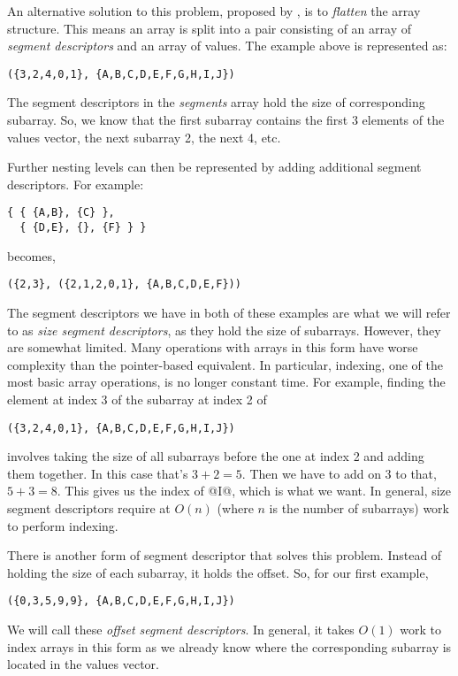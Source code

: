 An alternative solution to this problem, proposed by \citet{Blelloch:compiling1988}, is to \emph{flatten} the array structure. This means an array is split into a pair consisting of an array of \emph{segment descriptors} and an array of values. The example above is represented as:
%
\begin{lstlisting}
({3,2,4,0,1}, {A,B,C,D,E,F,G,H,I,J})
\end{lstlisting}
%
The segment descriptors in the \emph{segments} array hold the size of corresponding subarray. So, we know that the first subarray contains the first 3 elements of the values vector, the next subarray 2, the next 4, etc.

Further nesting levels can then be represented by adding additional segment descriptors. For example:
%
\begin{lstlisting}
{ { {A,B}, {C} },
  { {D,E}, {}, {F} } }
\end{lstlisting}
%
becomes,
%
\begin{lstlisting}
({2,3}, ({2,1,2,0,1}, {A,B,C,D,E,F}))
\end{lstlisting}


The segment descriptors we have in both of these examples are what we will refer to as \emph{size segment descriptors}, as they hold the size of subarrays. However, they are somewhat limited. Many operations with arrays in this form have worse complexity than the pointer-based equivalent. In particular, indexing, one of the most basic array operations, is no longer constant time. For example, finding the element at index 3 of the subarray at index 2 of
%
\begin{lstlisting}
({3,2,4,0,1}, {A,B,C,D,E,F,G,H,I,J})
\end{lstlisting}
%
involves taking the size of all subarrays before the one at index 2 and adding them together. In this case that's $3+2=5$. Then we have to add on 3 to that, $5+3=8$. This gives us the index of @I@, which is what we want. In general, size segment descriptors require at $O(n)$ (where $n$ is the number of subarrays) work to perform indexing.

There is another form of segment descriptor that solves this problem. Instead of holding the size of each subarray, it holds the offset. So, for our first example,
%
\begin{lstlisting}
({0,3,5,9,9}, {A,B,C,D,E,F,G,H,I,J})
\end{lstlisting}
%
We will call these \emph{offset segment descriptors}. In general, it takes $O(1)$ work to index arrays in this form as we already know where the corresponding subarray is located in the values vector.

